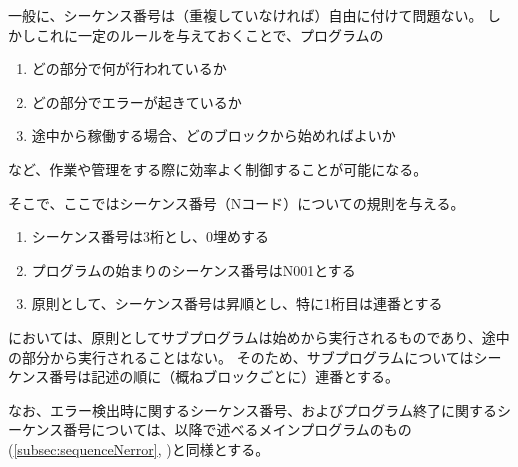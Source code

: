 

一般に、シーケンス番号は（重複していなければ）自由に付けて問題ない。
しかしこれに一定のルールを与えておくことで、プログラムの
\begin{enumerate}
\item どの部分で何が行われているか
\item どの部分でエラーが起きているか
\item 途中から稼働する場合、どのブロックから始めればよいか
\end{enumerate}
など、作業や管理をする際に効率よく制御することが可能になる。

そこで、ここではシーケンス番号（Nコード）についての規則を与える。



\begin{enumerate}[label=\Roman*), ref=\Roman*)]
\item シーケンス番号は3桁とし、0埋めする
\item プログラムの始まりのシーケンス番号は{\ttfamily N001}とする
\item 原則として、シーケンス番号は昇順とし、特に1桁目は連番とする
\end{enumerate}


\DMC においては、原則としてサブプログラムは始めから実行されるものであり、途中の部分から実行されることはない。
そのため、サブプログラムについてはシーケンス番号は記述の順に（概ねブロックごとに）連番とする。

なお、エラー検出時に関するシーケンス番号、およびプログラム終了に関するシーケンス番号については、以降で述べるメインプログラムのもの(\autoref{subsec:sequenceNerror}, )と同様とする。



